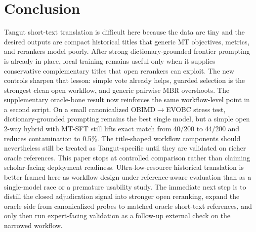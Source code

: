 \section{Conclusion}

Tangut short-text translation is difficult here because the data are tiny and the desired outputs are compact historical titles that generic MT objectives, metrics, and rerankers model poorly. After strong dictionary-grounded frontier prompting is already in place, local training remains useful only when it supplies conservative complementary titles that open rerankers can exploit. The new controls sharpen that lesson: simple vote already helps, guarded selection is the strongest clean open workflow, and generic pairwise MBR overshoots. The supplementary oracle-bone result now reinforces the same workflow-level point in a second script. On a small canonicalized OBIMD$\rightarrow$EVOBC stress test, dictionary-grounded prompting remains the best single model, but a simple open 2-way hybrid with MT-SFT still lifts exact match from 40/200 to 44/200 and reduces contamination to 0.5\%. The title-shaped workflow components should nevertheless still be treated as Tangut-specific until they are validated on richer oracle references. This paper stops at controlled comparison rather than claiming scholar-facing deployment readiness. Ultra-low-resource historical translation is better framed here as workflow design under reference-aware evaluation than as a single-model race or a premature usability study. The immediate next step is to distill the closed adjudication signal into stronger open reranking, expand the oracle side from canonicalized probes to matched oracle short-text references, and only then run expert-facing validation as a follow-up external check on the narrowed workflow.
